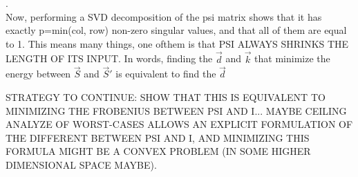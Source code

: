 \documentclass[11pt]{scrartcl} %
\begin{document}
  .\\[20pt]
  Now, performing a SVD decomposition of the psi matrix shows that it has exactly p=min(col, row) non-zero singular values, and that all of them are equal to 1. This means many things, one ofthem is that PSI ALWAYS SHRINKS THE LENGTH OF ITS INPUT.
  In words, finding the \(\vec{d}\) and \(\vec{k}\) that minimize  the energy between \(\vec{S}\) and \(\vec{S}'\) is equivalent to find the \(\vec{d}\)

STRATEGY TO CONTINUE: SHOW THAT THIS IS EQUIVALENT TO MINIMIZING THE FROBENIUS BETWEEN PSI AND I... MAYBE CEILING ANALYZE OF WORST-CASES ALLOWS AN EXPLICIT FORMULATION OF THE DIFFERENT BETWEEN PSI AND I, AND MINIMIZING THIS FORMULA MIGHT BE A CONVEX PROBLEM (IN SOME HIGHER DIMENSIONAL SPACE MAYBE).




  
  
\end{document}

